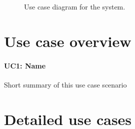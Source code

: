 \documentclass[english]{sareport}
\begin{document}
\begin{figure}[!htp]
    \centering
    \caption{Use case diagram for the system.}\label{fig:use_case_model}
\end{figure}

\section{Use case overview}\label{sec:uc_overview}
\paragraph{UC1: Name}
Short summary of this use case scenario

\section{Detailed use cases}
\end{document}
